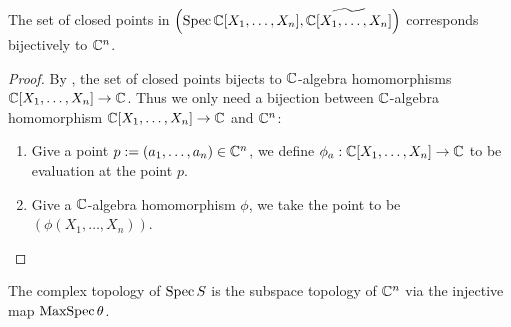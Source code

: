 \begin{theorem}
  The set of closed points in $\left(\operatorname*{Spec}{\mathbb{C}[X_{1},\dots, X_{n}]}, \widetilde{\mathbb{C}[X_{1},\dots, X_{n}]}\right)$ corresponds bijectively to $\mathbb{C}^{n}$.

\end{theorem}
\begin{proof}
  By , the set of closed points
  bijects to $\mathbb{C}$-algebra homomorphisms $\mathbb{C}[X_{1}, \dots, X_{n}] \to \mathbb{C}$. Thus we only need a bijection between $\mathbb{C}$-algebra homomorphism $\mathbb{C}[X_{1}, \dots, X_{n}] \to \mathbb{C}$ and $\mathbb{C}^{n}$:
  \begin{enumerate}
    \item Give a point $p := (a_{1},\dots, a_{n}) \in \mathbb{C}^{n}$, we define $\phi_{a}: \mathbb{C}[X_{1},\dots, X_{n}] \to \mathbb{C}$ to be evaluation at the point $p$.

    \item Give a $\mathbb{C}$-algebra homomorphism $\phi$, we take the point to be $(\phi(X_{1}, \dots, X_{n}))$.
  \end{enumerate}
\end{proof}

\begin{definition}
  The complex topology of $\operatorname{Spec} S$ is the subspace topology of $\mathbb{C}^{n}$ via the injective map $\operatorname{MaxSpec} \theta$.
\end{definition}

